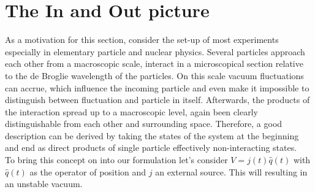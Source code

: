 \documentclass[12pt, titlepage]{article}
\begin{document}
\section{The In and Out picture}
As a motivation for this section, consider the set-up of most experiments especially in elementary particle and nuclear physics. Several particles approach each other from a macroscopic scale, interact in a microscopical section relative to the de Broglie wavelength of the particles. On this scale vacuum fluctuations can accrue, which influence the incoming particle and even make it impossible to distinguish between fluctuation and particle in itself. Afterwards, the products of the interaction spread up to a macroscopic level, again been clearly distinguishable from each other and surrounding space. Therefore, a good description can be derived by taking the states of the system at the beginning and end as direct products of single particle effectively non-interacting states.\\ 
To bring this concept on into our formulation let's consider $ V=j(t)\hat{q}(t) $ with $ \hat{q}(t) $ as the operator of position and $ j $ an external source. This will resulting in an unstable vacuum. 
\newpage
\end{document}

